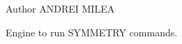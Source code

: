 \begin{DoxyAuthor}{Author}
A\-N\-D\-R\-E\-I M\-I\-L\-E\-A
\end{DoxyAuthor}
Engine to run S\-Y\-M\-M\-E\-T\-R\-Y commands. 